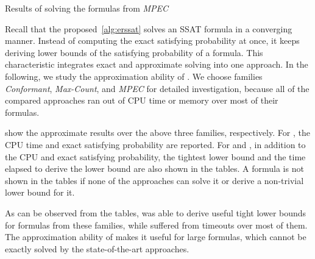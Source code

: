 \begin{table}[ht]
    \centering
    \scriptsize
    \caption{Results of solving the formulas from \textit{MPEC}}
    \label{tbl:exist-random-ssat-mpec}
    \begin{adjustbox}{angle=90}
    \end{adjustbox}
\end{table}

Recall that the proposed~\cref{alg:erssat} solves an SSAT formula in a converging manner.
Instead of computing the exact satisfying probability at once,
it keeps deriving lower bounds of the satisfying probability of a formula.
This characteristic integrates exact and approximate solving into one approach.
In the following, we study the approximation ability of \erssat.
We choose families \textit{Conformant}, \textit{Max-Count}, and \textit{MPEC} for detailed investigation,
because all of the compared approaches ran out of CPU time or memory over most of their formulas.

show the approximate results over the above three families, respectively.
For \dcssat, the CPU time and exact satisfying probability are reported.
For \erssat and \erssatb, in addition to the CPU and exact satisfying probability,
the tightest lower bound and the time elapsed to derive the lower bound are also shown in the tables.
A formula is not shown in the tables
if none of the approaches can solve it or derive a non-trivial lower bound for it.

As can be observed from the tables,
\erssat was able to derive useful tight lower bounds for formulas from these families,
while \dcssat suffered from timeouts over most of them.
The approximation ability of \erssat makes it useful for large formulas,
which cannot be exactly solved by the state-of-the-art approaches.

